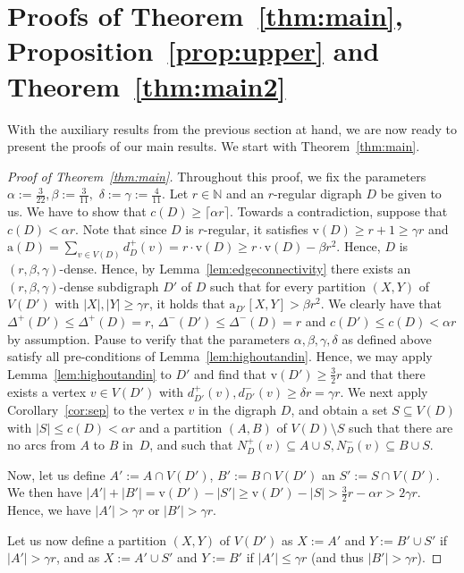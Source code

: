 \documentclass[a4paper,10pt]{article}
\begin{document}
\section{Proofs of Theorem~\ref{thm:main}, Proposition~\ref{prop:upper} and Theorem~\ref{thm:main2}}\label{sec:proof}
With the auxiliary results from the previous section at hand, we are now ready to present the proofs of our main results. We start with Theorem~\ref{thm:main}.
\begin{proof}[Proof of Theorem~\ref{thm:main}]
Throughout this proof, we fix the parameters $\alpha:=\frac{3}{22}, \beta:=\frac{3}{11},$ $\delta:=\gamma:=\frac{4}{11}$.
Let $r\in \mathbb{N}$ and an $r$-regular digraph $D$ be given to us. We have to show that $c(D)\ge \lceil \alpha r\rceil$. Towards a contradiction, suppose that $c(D)<\alpha r$. Note that since $D$ is $r$-regular, it satisfies $\mathrm{v}(D)\ge r+1\ge \gamma r$ and $\mathrm{a}(D)=\sum_{v\in V(D)}d_D^+(v)=r\cdot \mathrm{v}(D)\ge r\cdot \mathrm{v}(D)-\beta r^2$. Hence, $D$ is $(r,\beta,\gamma)$-dense. Hence, by Lemma~\ref{lem:edgeconnectivity} there exists an $(r,\beta,\gamma)$-dense subdigraph $D'$ of $D$ such that for every partition $(X,Y)$ of $V(D')$ with $|X|, |Y|\ge \gamma r$, it holds that $\mathrm{a}_{D'}[X,Y]> \beta r^2$. We clearly have that $\Delta^+(D')\le \Delta^+(D)=r$, $\Delta^-(D')\le \Delta^-(D)=r$ and $c(D')\le c(D)<\alpha r$ by assumption. Pause to verify that the parameters $\alpha,\beta,\gamma,\delta$ as defined above satisfy all pre-conditions of Lemma~\ref{lem:highoutandin}. Hence, we may apply Lemma~\ref{lem:highoutandin} to $D'$ and find that $\mathrm{v}(D')\ge \frac{3}{2}r$ and that there exists a vertex $v\in V(D')$ with $d_{D'}^+(v), d_{D'}^-(v)\ge \delta r=\gamma r$. 
We next apply Corollary~\ref{cor:sep} to the vertex $v$ in the digraph $D$, and obtain a set $S\subseteq V(D)$ with $|S|\le c(D)<\alpha r$ and a partition $(A,B)$ of $V(D)\setminus S$ such that there are no arcs from $A$ to $B$ in~$D$, and such that $N_D^+(v)\subseteq A\cup S, N_D^-(v)\subseteq B\cup S$. 

Now, let us define $A':=A\cap V(D')$, $B':=B\cap V(D')$ an $S':=S\cap V(D')$. We then have $|A'|+|B'|= \mathrm{v}(D')-|S'|\ge \mathrm{v}(D')-|S|>\frac{3}{2}r-\alpha r>2\gamma r$. Hence, we have $|A'|>\gamma r$ or $|B'|>\gamma r$. 

Let us now define a partition $(X,Y)$ of $V(D')$ as $X:=A'$ and $Y:=B'\cup S'$ if $|A'|>\gamma r$, and as $X:=A'\cup S'$ and $Y:=B'$ if $|A'|\le \gamma r$ (and thus $|B'|>\gamma r$). 


\end{proof}
\end{document}
